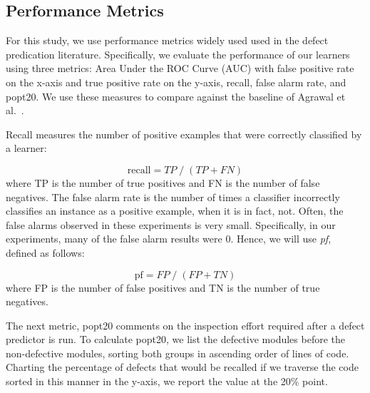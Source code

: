 \documentclass[10pt,compsoc,twocolumn]{IEEEtran}
\newcommand{\bi}{\begin{itemize}}
\newcommand{\ei}{\end{itemize}}
\begin{document}





\subsection{Performance Metrics}\label{sec:perfs}
For this study, we use   performance metrics widely used     used in 
the defect predication literature.
Specifically, we evaluate the performance of our learners using three metrics: Area Under the ROC Curve (AUC) with false positive rate on the x-axis and true positive rate on the y-axis, recall, false alarm rate, and popt20. We use these measures to compare against the baseline of Agrawal et al.~\cite{agrawal2019dodge}.

Recall measures the number of positive examples that were correctly classified by a learner:

\[
    \text{recall} = \mathit{TP}\;/\;(\mathit{TP}+\mathit{FN})
\]
where TP is the number of true positives and FN is the number of false negatives.
The false alarm rate is the number of times a classifier incorrectly classifies an instance as a positive example, when it is in fact, not. Often, the false alarms observed in these experiments is very
small. Specifically, in our experiments, many of the false alarm results were 0. Hence, we will use {\em pf}, defined as follows:

\[
     \text{pf} =  \mathit{FP}\;/\;(\mathit{FP}+\mathit{TN}) %
\]
where FP is the number of false positives and TN is the number of true negatives. 

The next metric, popt20 comments on the inspection effort required after a defect predictor is run. To calculate popt20, we list the defective modules before the non-defective modules, sorting both groups in ascending order of lines of code. Charting the percentage of defects that would be recalled if we traverse the code sorted in this manner in the y-axis, we report the value at the 20\% point. 
\end{document}
